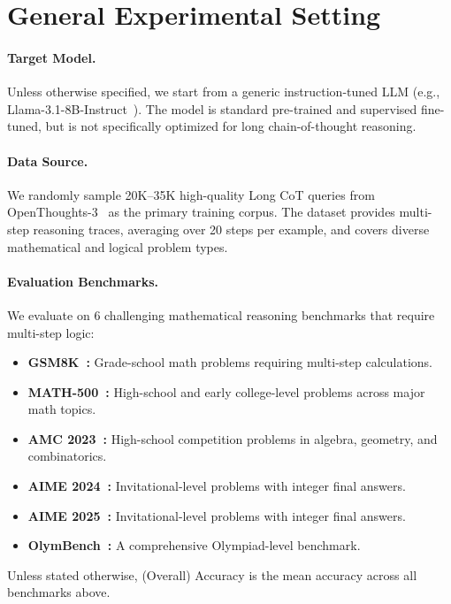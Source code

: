 \section{General Experimental Setting}
\paragraph{\textbf{Target Model.}} Unless otherwise specified, we start from a generic instruction-tuned LLM (e.g., Llama-3.1-8B-Instruct~\citep{dubey2024llama}). The model is standard pre-trained and supervised fine-tuned, but is not specifically optimized for long chain-of-thought reasoning.\vspace{-5pt}

\paragraph{\textbf{Data Source.}} We randomly sample 20K--35K high-quality Long CoT queries from OpenThoughts-3~\citep{guha2025openthoughts} as the primary training corpus. The dataset provides multi-step reasoning traces, averaging over 20 steps per example, and covers diverse mathematical and logical problem types.\vspace{-5pt}

\paragraph{\textbf{Evaluation Benchmarks.}} We evaluate on 6 challenging mathematical reasoning benchmarks that require multi-step logic:
\begin{itemize}[leftmargin=16pt, itemsep=0pt, topsep=0pt]
  \item \textbf{GSM8K~\citep{cobbe2021training}:} Grade-school math problems requiring multi-step calculations.
  \item \textbf{MATH-500~\citep{hendrycks2021measuring}:} High-school and early college-level problems across major math topics.
  \item \textbf{AMC 2023~\citep{amc2023}:} High-school competition problems in algebra, geometry, and combinatorics.
  \item \textbf{AIME 2024~\citep{aime2024}:} Invitational-level problems with integer final answers.
  \item \textbf{AIME 2025~\citep{aime2025}:} Invitational-level problems with integer final answers.
  \item \textbf{OlymBench~\citep{he2024olympiadbench}:} A comprehensive Olympiad-level benchmark.
\end{itemize}
Unless stated otherwise, (Overall) Accuracy is the mean accuracy across all benchmarks above.\vspace{-5pt}

